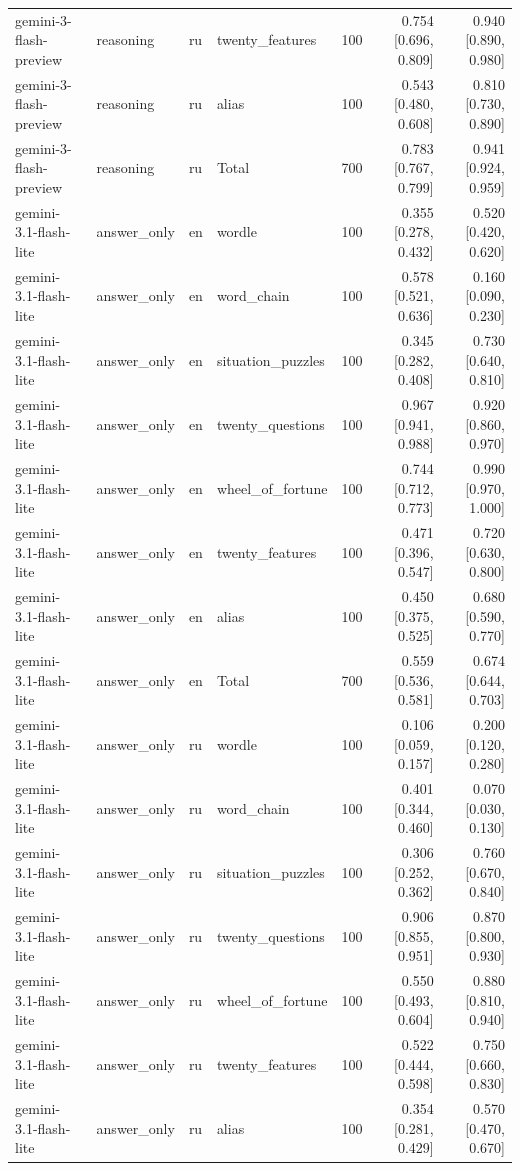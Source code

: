 \begin{longtable}{llllrrr}
gemini-3-flash-preview & reasoning & ru & twenty\_features & 100 & 0.754 [0.696, 0.809] & 0.940 [0.890, 0.980] \\
gemini-3-flash-preview & reasoning & ru & alias & 100 & 0.543 [0.480, 0.608] & 0.810 [0.730, 0.890] \\
gemini-3-flash-preview & reasoning & ru & Total & 700 & 0.783 [0.767, 0.799] & 0.941 [0.924, 0.959] \\
gemini-3.1-flash-lite & answer\_only & en & wordle & 100 & 0.355 [0.278, 0.432] & 0.520 [0.420, 0.620] \\
gemini-3.1-flash-lite & answer\_only & en & word\_chain & 100 & 0.578 [0.521, 0.636] & 0.160 [0.090, 0.230] \\
gemini-3.1-flash-lite & answer\_only & en & situation\_puzzles & 100 & 0.345 [0.282, 0.408] & 0.730 [0.640, 0.810] \\
gemini-3.1-flash-lite & answer\_only & en & twenty\_questions & 100 & 0.967 [0.941, 0.988] & 0.920 [0.860, 0.970] \\
gemini-3.1-flash-lite & answer\_only & en & wheel\_of\_fortune & 100 & 0.744 [0.712, 0.773] & 0.990 [0.970, 1.000] \\
gemini-3.1-flash-lite & answer\_only & en & twenty\_features & 100 & 0.471 [0.396, 0.547] & 0.720 [0.630, 0.800] \\
gemini-3.1-flash-lite & answer\_only & en & alias & 100 & 0.450 [0.375, 0.525] & 0.680 [0.590, 0.770] \\
gemini-3.1-flash-lite & answer\_only & en & Total & 700 & 0.559 [0.536, 0.581] & 0.674 [0.644, 0.703] \\
gemini-3.1-flash-lite & answer\_only & ru & wordle & 100 & 0.106 [0.059, 0.157] & 0.200 [0.120, 0.280] \\
gemini-3.1-flash-lite & answer\_only & ru & word\_chain & 100 & 0.401 [0.344, 0.460] & 0.070 [0.030, 0.130] \\
gemini-3.1-flash-lite & answer\_only & ru & situation\_puzzles & 100 & 0.306 [0.252, 0.362] & 0.760 [0.670, 0.840] \\
gemini-3.1-flash-lite & answer\_only & ru & twenty\_questions & 100 & 0.906 [0.855, 0.951] & 0.870 [0.800, 0.930] \\
gemini-3.1-flash-lite & answer\_only & ru & wheel\_of\_fortune & 100 & 0.550 [0.493, 0.604] & 0.880 [0.810, 0.940] \\
gemini-3.1-flash-lite & answer\_only & ru & twenty\_features & 100 & 0.522 [0.444, 0.598] & 0.750 [0.660, 0.830] \\
gemini-3.1-flash-lite & answer\_only & ru & alias & 100 & 0.354 [0.281, 0.429] & 0.570 [0.470, 0.670] \\

\end{longtable}
